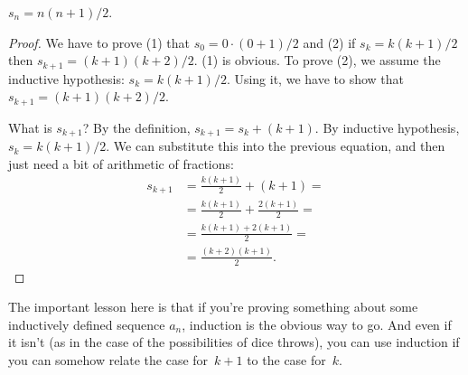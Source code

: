 \documentclass[../../../include/open-logic-section]{subfiles}
\begin{document}
\begin{prop}
  $s_n = n(n+1)/2$.
\end{prop}

\begin{proof}
  We have to prove (1) that $s_0 = 0\cdot(0 + 1)/2$ and (2) if $s_k =
  k(k+1)/2$ then $s_{k+1} = (k+1)(k+2)/2$.  (1) is obvious. To prove
  (2), we assume the inductive hypothesis: $s_k = k(k+1)/2$. Using it,
  we have to show that $s_{k+1} = (k+1)(k+2)/2$.

  What is $s_{k+1}$?  By the definition, $s_{k+1} = s_k + (k+1)$.  By
  inductive hypothesis, $s_k = k(k+1)/2$. We can substitute this into
  the previous equation, and then just need a bit of arithmetic of
  fractions:
  \begin{align*}
    s_{k+1} & = \frac{k(k+1)}{2} + (k+1) = {}\\
    & = \frac{k(k+1)}{2} + \frac{2(k+1)}{2} = {}\\
    & = \frac{k(k+1) + 2(k+1)}{2} = {}\\
    & = \frac{(k+2)(k+1)}{2}.
  \end{align*}
\end{proof}

The important lesson here is that if you're proving something about
some inductively defined sequence $a_n$, induction is the obvious way
to go. And even if it isn't (as in the case of the possibilities of
dice throws), you can use induction if you can somehow relate the case
for~$k+1$ to the case for~$k$.
\end{document}
